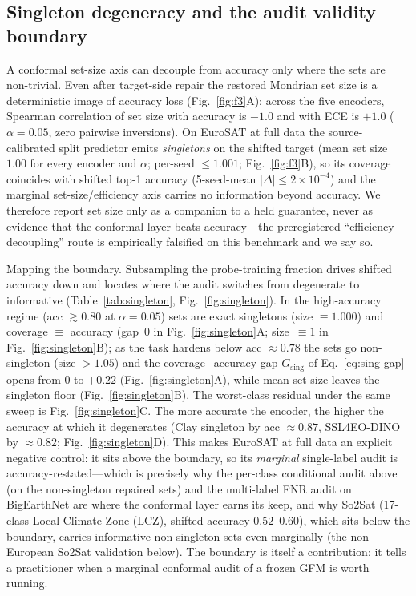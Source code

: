 \documentclass[preprint,11pt,authoryear]{elsarticle}
\begin{document}
\subsection*{Singleton degeneracy and the audit validity boundary}
A conformal set-size axis can decouple from accuracy only where the sets are non-trivial. Even after
target-side repair the restored Mondrian set size is a deterministic image of accuracy loss
(Fig.~\ref{fig:f3}A): across the five encoders, Spearman correlation of set size with
accuracy is $-1.0$ and with ECE is $+1.0$ ($\alpha{=}0.05$, zero pairwise inversions). On EuroSAT at
full data the source-calibrated split predictor emits \emph{singletons} on the shifted target (mean set
size $1.00$ for every encoder and $\alpha$; per-seed $\le1.001$; Fig.~\ref{fig:f3}B), so its coverage coincides with shifted
top-1 accuracy (5-seed-mean $|\Delta|\le2\times10^{-4}$) and the marginal set-size/efficiency axis carries
no information beyond accuracy. We
therefore report set size only as a companion to a held guarantee, never as evidence that the conformal
layer beats accuracy---the preregistered ``efficiency-decoupling'' route is empirically falsified on this
benchmark and we say so.

Mapping the boundary. Subsampling the probe-training fraction drives shifted accuracy down and
locates where the audit switches from degenerate to informative (Table~\ref{tab:singleton},
Fig.~\ref{fig:singleton}). In the
high-accuracy regime (acc $\gtrsim0.80$ at $\alpha{=}0.05$) sets are exact singletons (size $\equiv1.000$)
and coverage $\equiv$ accuracy (gap~$0$ in Fig.~\ref{fig:singleton}A; size~$\equiv1$ in Fig.~\ref{fig:singleton}B); as the task hardens below acc $\approx0.78$ the sets go non-singleton
(size $>1.05$) and the coverage$-$accuracy gap $G_{\mathrm{sing}}$ of Eq.~\eqref{eq:sing-gap} opens from
$0$ to $+0.22$ (Fig.~\ref{fig:singleton}A), while mean set size leaves the singleton floor (Fig.~\ref{fig:singleton}B).
The worst-class residual under the same sweep is Fig.~\ref{fig:singleton}C. The more accurate the encoder,
the higher the accuracy at which it degenerates (Clay singleton by acc $\approx0.87$, SSL4EO-DINO by
$\approx0.82$; Fig.~\ref{fig:singleton}D). This makes EuroSAT at full data an explicit negative control: it sits above
the boundary, so its \emph{marginal} single-label audit is accuracy-restated---which is precisely why the
per-class conditional audit above (on the non-singleton repaired sets) and the multi-label FNR audit
on BigEarthNet are where the conformal layer earns its keep, and why So2Sat (17-class Local Climate Zone (LCZ), shifted accuracy
$0.52$--$0.60$), which sits below the boundary, carries informative non-singleton sets even
marginally (the non-European So2Sat validation below). The boundary is itself a contribution: it tells a practitioner when a
marginal conformal audit of a frozen GFM is worth running.
\end{document}
